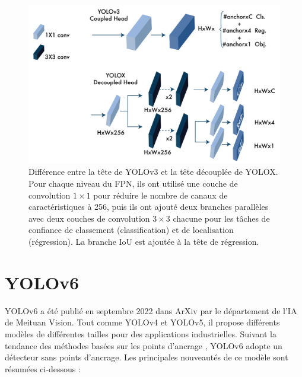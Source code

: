 \documentclass{article}
\begin{document}
\begin{figure}[htbp]
    \centering
    \includegraphics[scale=0.25]{Figures/X.png}
    \caption{Différence entre la tête de YOLOv3 et la tête découplée de YOLOX. Pour chaque niveau du FPN, ils ont utilisé une couche de convolution $1 \times 1$ pour réduire le nombre de canaux de caractéristiques à 256, puis ils ont ajouté deux branches parallèles avec deux couches de convolution $3 \times 3$ chacune pour les tâches de confiance de classement (classification) et de localisation (régression). La branche IoU est ajoutée à la tête de régression.}
    \label{fig:x}
\end{figure}
\vspace{0.6cm}

\section{YOLOv6}
YOLOv6 \cite{86} a été publié en septembre 2022 dans ArXiv par le département de l'IA de Meituan Vision. Tout comme YOLOv4 et YOLOv5, il propose différents modèles de différentes tailles pour des applications industrielles. Suivant la tendance des méthodes basées sur les points d'ancrage \cite{78,81}, YOLOv6 adopte un détecteur sans points d'ancrage. Les principales nouveautés de ce modèle sont résumées ci-dessous :
\end{document}
